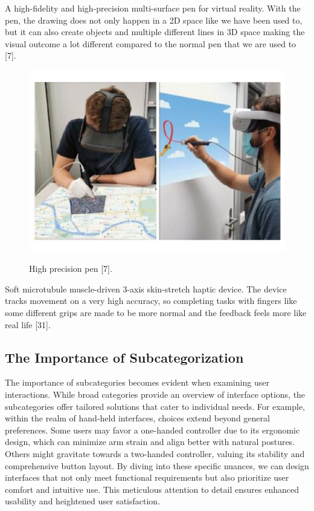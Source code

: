 A high-fidelity and high-precision multi-surface pen for virtual reality. With the pen, the drawing does not only happen in a 2D space like we have been used to, but it can also create objects and multiple different lines in 3D space making the visual outcome a lot different compared to the normal pen that we are used to [7].

\begin{figure}[!htbp]
	\includegraphics[width=\linewidth]{figures/pen.pdf}
	\label{fig:pen}
	\caption{High precision pen [7].}
\end{figure}

Soft microtubule muscle-driven 3-axis skin-stretch haptic device. The device tracks movement on a very high accuracy, so completing tasks with fingers like some different grips are made to be more normal and the feedback feels more like real life [31].




\subsection{The Importance of Subcategorization}

The importance of subcategories becomes evident when examining user interactions. While broad categories provide an overview of interface options, the subcategories offer tailored solutions that cater to individual needs. For example, within the realm of hand-held interfaces, choices extend beyond general preferences. Some users may favor a one-handed controller due to its ergonomic design, which can minimize arm strain and align better with natural postures. Others might gravitate towards a two-handed controller, valuing its stability and comprehensive button layout. By diving into these specific nuances, we can design interfaces that not only meet functional requirements but also prioritize user comfort and intuitive use. This meticulous attention to detail ensures enhanced usability and heightened user satisfaction. 

